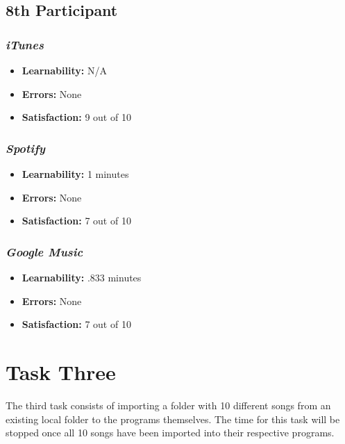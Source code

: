 \documentclass{article}
\begin{document}
\begin{multicols}{2}
\subsection{8th Participant}

\subsubsection{\it iTunes}
\begin{itemize}
	\item {\bf Learnability:} N/A
	\item {\bf Errors:} None
	\item {\bf Satisfaction:} 9 out of 10 
\end{itemize}

\subsubsection{\it Spotify}
\begin{itemize}
	\item {\bf Learnability:} 1 minutes
	\item {\bf Errors:} None
	\item {\bf Satisfaction:} 7 out of 10 
\end{itemize}

\subsubsection{\it Google Music}
\begin{itemize}
\item {\bf Learnability:} .833 minutes
	\item {\bf Errors:} None
	\item {\bf Satisfaction:} 7 out of 10 
\end{itemize}
\end{multicols}

\section{Task Three}
The third task consists of importing a folder with 10 different songs from an existing local folder to the programs themselves. The time for this task will be stopped once all 10 songs have been imported into their respective programs.
\end{document}
